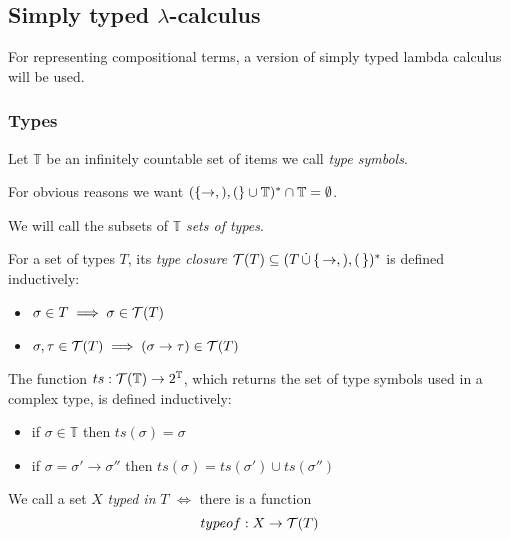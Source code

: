 \documentclass[main.tex]{subfiles}
\begin{document}
\subsection{Simply typed $\lambda$-calculus}
\label{sec:purelambda}

For representing compositional terms, a version of simply typed lambda calculus
will be used.

\subsubsection{Types}
\label{purelambda:types}
\begin{defn}
    Let $\mathbb{T}$ be an infinitely countable set of items we call
    \emph{type symbols}.

    For obvious reasons we want $(\{ \rightarrow, ), ( \} \cup \mathbb{T})^*
    \cap \mathbb{T} = \emptyset$.

    We will call the subsets of $\mathbb{T}$ \emph{sets of types}.
\end{defn}

\begin{defn}
    For a set of types $T$, its \emph{type closure}
    $\mathcal{T}( T ) \subseteq (T \, \dot\cup \,\{\, \rightarrow, ), ( \,\})^*$ is defined
    inductively:

    \begin{itemize}
        \item $\sigma \in T \implies \sigma \in \mathcal{T}( T )$
        \item $\sigma, \tau \in \mathcal{T}( T ) \implies (\sigma \rightarrow \tau) \in \mathcal{T}( T )$
    \end{itemize}
\end{defn}

\begin{defn}
    The function $ts : \mathcal{T}( \mathbb{T} ) \rightarrow 2^\mathbb{T}$, which
    returns the set of type symbols used in a complex type, is defined inductively:

    \begin{itemize}
        \item if $\sigma \in \mathbb{T}$ then $ts(\sigma) = \sigma$
        \item if $\sigma = \sigma' \rightarrow \sigma''$ then
            $ts(\sigma) = ts(\sigma') \cup ts(\sigma'')$
    \end{itemize}
\end{defn}

\begin{defn}
    We call a set $X$ \emph{typed in} $T$ $\iff$ there is a function
    \[ typeof : X \rightarrow \mathcal{T}( T ) \]
\end{defn}
\end{document}
